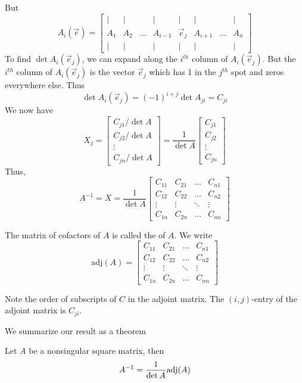 \documentclass{ximera}
\begin{document}
But
$$A_i(\vec{e})=\begin{bmatrix}
           | & |& &|&|&|&&|\\
		A_1 & A_2&\dots &A_{i-1}&\vec{e}_j&A_{i+1}&\dots&A_n\\
		| & |& &|&|&|&&|
         \end{bmatrix}$$
To find $\det{A_i(\vec{e}_j)}$, we can expand along the $i^{th}$ column of $A_i(\vec{e}_j)$.  But the $i^{th}$ column of $A_i(\vec{e}_j)$ is the vector $\vec{e}_j$ which has 1 in the $j^{th}$ spot and zeros everywhere else.  Thus 
$$\det{A_i(\vec{e}_j)}=(-1)^{i+j}\det{A_{ji}}=C_{ji}$$
We now have
$$X_j=\begin{bmatrix}C_{j1}/\det{A}\\C_{j2}/\det{A}\\\vdots\\C_{jn}/\det{A}\end{bmatrix}=\frac{1}{\det{A}}\begin{bmatrix}C_{j1}\\C_{j2}\\\vdots\\C_{jn}\end{bmatrix}$$
Thus,
$$A^{-1}=X=\frac{1}{\det{A}}\begin{bmatrix}C_{11}&C_{21}&\ldots&C_{n1}\\C_{12}&C_{22}&\ldots&C_{n2}\\\vdots&\vdots&\ddots&\vdots\\
C_{1n}&C_{2n}&\ldots&C_{nn}\end{bmatrix}$$

The matrix of cofactors of $A$ is called the  of $A$.  We write
$$\text{adj}(A)=\begin{bmatrix}C_{11}&C_{21}&\ldots&C_{n1}\\C_{12}&C_{22}&\ldots&C_{n2}\\\vdots&\vdots&\ddots&\vdots\\
C_{1n}&C_{2n}&\ldots&C_{nn}\end{bmatrix}$$

\begin{warning}
Note the order of subscripts of $C$ in the adjoint matrix.  The $(i,j)$-entry of the adjoint matrix is $C_{ji}$.
\end{warning}

We summarize our result as a theorem 

\begin{theorem}\label{th:adjointinverseformula}
Let $A$ be a nonsingular square matrix, then
$$A^{-1}=\frac{1}{\det{A}}\textnormal{adj}(A)$$
\end{theorem}
\end{document}
